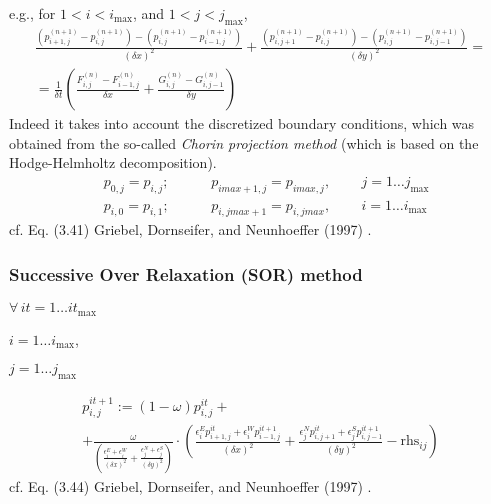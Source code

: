 \documentclass[10pt]{amsart}
\begin{document}
\begin{multicols*}{2}
e.g., for $1 < i < i_{\text{max}}$, and $1< j < j_{\text{max}}$, 
\[
\begin{gathered}
  \frac{   (p_{i+1,j}^{(n+1)} - p_{i,j}^{(n+1)} ) -  (p_{i,j}^{(n+1)} - p_{i-1,j}^{(n+1)} ) }{ (\delta x)^2 } + \frac{  (p_{i,j+1}^{(n+1)} - p_{i,j}^{(n+1)} ) - (p_{i,j}^{(n+1)} - p_{i,j-1}^{(n+1)} ) }{ (\delta y)^2 } = \\
  = \frac{1}{ \delta t} \left( \frac{F_{i,j}^{(n)} - F_{i-1,j}^{(n)} }{\delta x} + \frac{ G_{i,j}^{(n)} - G_{i,j-1}^{(n)} }{ \delta y } \right) 
\end{gathered}
\]
Indeed it takes into account the discretized boundary conditions, which was obtained from the so-called \emph{Chorin projection method} (which is based on the Hodge-Helmholtz decomposition).
\begin{equation}
  \begin{aligned}
    &   p_{0,j} = p_{i,j} ; \qquad \, & p_{imax+1,j} = p_{imax,j} , \qquad \, j=1\dots j_{\text{max} } \\ 
        &   p_{i,0} = p_{i,1} ; \qquad \, & p_{i,jmax+1} = p_{i,jmax} , \qquad \, i=1\dots i_{\text{max} }  
    \end{aligned}
  \end{equation}
cf. Eq. (3.41) Griebel, Dornseifer, and Neunhoeffer (1997) \cite{GDN1997}.  

\subsubsection{Successive Over Relaxation (SOR) method}

$\forall \, it = 1\dots it_{\text{max}}$ 

\phantom{ \qquad \, } $i=1\dots i_{\text{max}}$,

\phantom{ \qquad \qquad \, } $j=1 \dots j_{\text{max}}$

\begin{equation}
  \begin{gathered}
    p^{it+1}_{i,j} := (1-\omega) p_{i,j}^{it} + \\
    + \frac{ \omega}{ \left( \frac{ \epsilon_i^E + \epsilon_i^W}{ (\delta x)^2 } + \frac{ \epsilon_j^N + \epsilon_j^S }{ (\delta y)^2 } \right) } \cdot \left( \frac{ \epsilon_i^E p_{i+1,j}^{it} + \epsilon^W_i p_{i-1,j}^{it+1} }{  (\delta x)^2 } + \frac{ \epsilon_j^N p_{i,j+1}^{it} + \epsilon_j^S p_{i,j-1}^{it +1} }{ (\delta y)^2 } - \text{rhs}_{ij} \right)
    \end{gathered}
  \end{equation}
cf. Eq. (3.44)  Griebel, Dornseifer, and Neunhoeffer (1997) \cite{GDN1997}.  


\end{multicols*}
\end{document}
